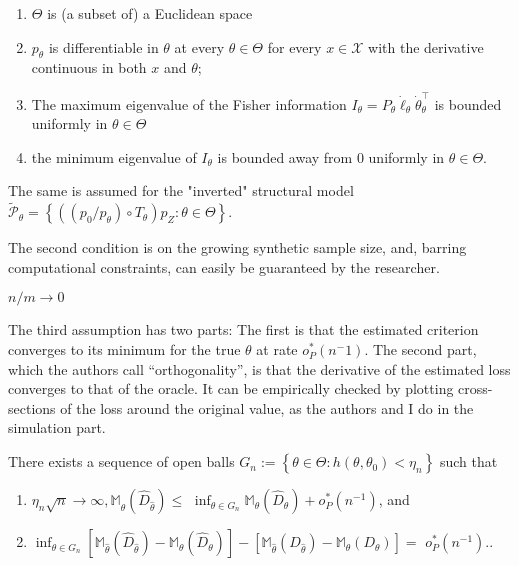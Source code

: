 \begin{assumption}[A1, KMP]
    \label{a:1}
    \begin{enumerate}
        \item $\Theta$ is (a subset of) a Euclidean space 
        \item $p_{\theta}$ is differentiable in $\theta$ at every $\theta \in \Theta$ for every $x \in \mathcal{X}$ with the derivative continuous in both $x$ and $\theta$; 
        \item The maximum eigenvalue of the Fisher information $I_{\theta}=P_{\theta} \dot{\ell}_{\theta} \dot{\theta}_{\theta}^{\top}$ is bounded uniformly in $\theta \in \Theta$ 
        \item the minimum eigenvalue of $I_{\theta}$ is bounded away from 0 uniformly in $\theta \in \Theta$.
    \end{enumerate}
    The same is assumed for the "inverted" structural model $\tilde{\mathcal{P}}_{\theta}=\left\{\left(\left(p_{0} / p_{\theta}\right) \circ T_{\theta}\right) p_{Z}: \theta \in \Theta\right\}$.
\end{assumption}

The second condition is on the growing synthetic sample size, and, barring computational constraints, can easily be guaranteed by the researcher. %
\begin{assumption}[A2, KMP]
    $n/m \rightarrow 0$
\end{assumption}

The third assumption has two parts: The first is that the estimated criterion converges to its minimum for the true $\theta$ at rate $o^{*}_P(n^-1)$. %
The second part, which the authors call ``orthogonality'', %
is that the derivative of the estimated loss converges to that of the oracle. %
It can be empirically checked by plotting cross-sections of the loss around the original value, as the authors and I do in the simulation part.

\begin{assumption}[A3, KMP]
    There exists a sequence of open balls $G_{n}:=\left\{\theta \in \Theta: h\left(\theta, \theta_{0}\right)<\eta_{n}\right\}$ such that
    \begin{enumerate}
        \item $\eta_{n} \sqrt{n} \rightarrow \infty, \mathbb{M}_{\hat{\theta}}\left(\hat{D}_{\hat{\theta}}\right) \leq$ $\inf _{\theta \in G_{n}} \mathbb{M}_{\theta}\left(\hat{D}_{\theta}\right)+o_{P}^{*}\left(n^{-1}\right)$, and
        \item $\inf _{\theta \in G_{n}}\left[\mathbb{M}_{\hat{\theta}}\left(\hat{D}_{\hat{\theta}}\right)-\mathbb{M}_{\theta}\left(\hat{D}_{\theta}\right)\right]-\left[\mathbb{M}_{\hat{\theta}}\left(D_{\hat{\theta}}\right)-\mathbb{M}_{\theta}\left(D_{\theta}\right)\right]=$ $o_{P}^{*}\left(n^{-1}\right)$..
    \end{enumerate}
\end{assumption}

